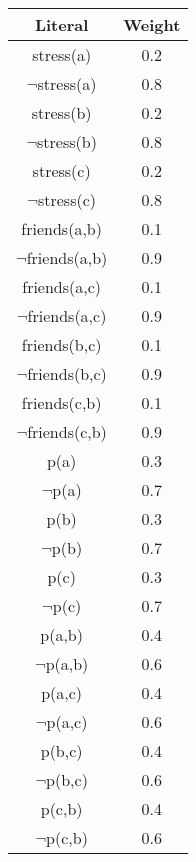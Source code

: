 \begin{multicols*}{2}
\begin{center}
\begin{tabular}{c|c}
Literal & Weight \\
\hline
stress(a) & 0.2 \\
$\lnot$stress(a) & 0.8 \\
stress(b) & 0.2 \\
$\lnot$stress(b) & 0.8 \\
stress(c) & 0.2 \\
$\lnot$stress(c) & 0.8 \\
friends(a,b) & 0.1 \\
$\lnot$friends(a,b) & 0.9 \\
friends(a,c) & 0.1 \\
$\lnot$friends(a,c) & 0.9 \\
friends(b,c) & 0.1 \\
$\lnot$friends(b,c) & 0.9 \\
friends(c,b) & 0.1 \\
$\lnot$friends(c,b) & 0.9 \\
p(a) & 0.3 \\
$\lnot$p(a) & 0.7 \\
p(b) & 0.3 \\
$\lnot$p(b) & 0.7 \\
p(c) & 0.3 \\
$\lnot$p(c) & 0.7 \\
p(a,b) & 0.4 \\
$\lnot$p(a,b) & 0.6 \\
p(a,c) & 0.4 \\
$\lnot$p(a,c) & 0.6 \\
p(b,c) & 0.4 \\
$\lnot$p(b,c) & 0.6 \\
p(c,b) & 0.4 \\
$\lnot$p(c,b) & 0.6 \\
\end{tabular}
\end{center}

\begin{figure*}
\centering
{}
\end{figure*}
\end{multicols*}

